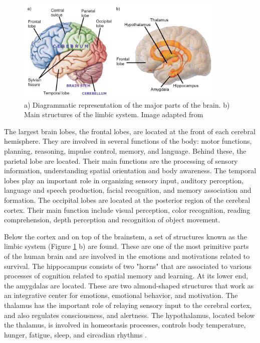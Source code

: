 \begin{figure}[ht]
\centering
\includegraphics[width=0.9\textwidth]{Images/brainParts.png}
\caption{a) Diagrammatic representation of the major parts of the brain. b) Main structures of the limbic system. Image adapted from \citet{Bear2016}}
\label{fig:anatomy}
\end{figure}

The largest brain lobes, the frontal lobes, are located at the front of each cerebral hemisphere. They are involved in several functions of the body: motor functions, planning, reasoning, impulse control, memory, and language. Behind these, the parietal lobe are located. Their main functions are the processing of sensory information, understanding spatial orientation and body awareness. The temporal lobes play an important role in organizing sensory input, auditory perception, language and speech production, facial recognition, and memory association and formation. The occipital lobes are located at the posterior region of the cerebral cortex. Their main function include visual perception, color recognition, reading comprehension, depth perception and recognition of object movement. 

Below the cortex and on top of the brainstem, a set of structures known as the limbic system (Figure \ref{fig:anatomy} b) are found. These are one of the most primitive parts of the human brain and are involved in the emotions and motivations related to survival. The hippocampus consists of two "horns" that are associated to various processes of cognition related to spatial memory and learning. At its lower end, the amygdalas are located. These are two almond-shaped structures that work as an integrative center for emotions, emotional behavior, and motivation. The thalamus has the important role of relaying sensory input to the cerebral cortex, and also regulates consciousness, and alertness. The hypothalamus, located below the thalamus, is involved in homeostasis processes, controls body temperature, hunger, fatigue, sleep, and circadian rhythms \citep{Purves2001}.

